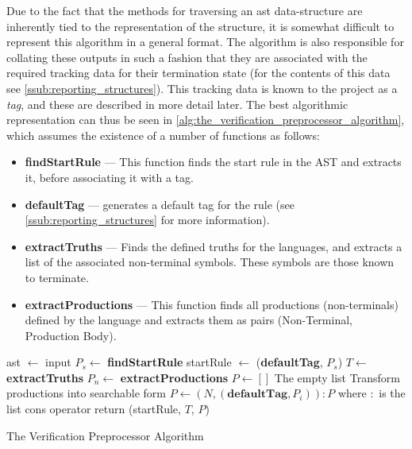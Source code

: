 Due to the fact that the methods for traversing an \gls{ast} data-structure are inherently tied to the representation of the structure, it is somewhat difficult to represent this algorithm in a general format.
The algorithm is also responsible for collating these outputs in such a fashion that they are associated with the required tracking data for their termination state (for the contents of this data see \autoref{ssub:reporting_structures}).
This tracking data is known to the project as a \textit{tag}, and these are described in more detail later. 
The best algorithmic representation can thus be seen in \autoref{alg:the_verification_preprocessor_algorithm}, which assumes the existence of a number of functions as follows: 
\begin{itemize}
    \item \textbf{findStartRule} --- This function finds the start rule in the AST and extracts it, before associating it with a tag.
    \item \textbf{defaultTag} --- generates a default tag for the rule (see \autoref{ssub:reporting_structures} for more information).
    \item \textbf{extractTruths} --- Finds the defined truths for the languages, and extracts a list of the associated non-terminal symbols.
    These symbols are those known to terminate.
    \item \textbf{extractProductions} --- This function finds all productions (non-terminals) defined by the language and extracts them as pairs (Non-Terminal, Production Body). 
\end{itemize}

\begin{algorithm}
\begin{algorithmic}
\State
\State ast $\gets$ input
\State
\State $P_s \gets$ \textbf{findStartRule} 
\State startRule $\gets$ (\textbf{defaultTag}, $P_s$)
\State $T \gets$ \textbf{extractTruths}
\State $P_n \gets$ \textbf{extractProductions}
\State $P \gets []$
\Comment The empty list
\Comment Transform productions into searchable form
    \State $P \gets (N, (\textbf{defaultTag}, P_i)) : P$
    \Comment where $:$ is the list cons operator
\EndFor
\State
\State return (startRule, $T$, $P$)
\end{algorithmic}
\caption{The Verification Preprocessor Algorithm}
\label{alg:the_verification_preprocessor_algorithm}
\end{algorithm}


